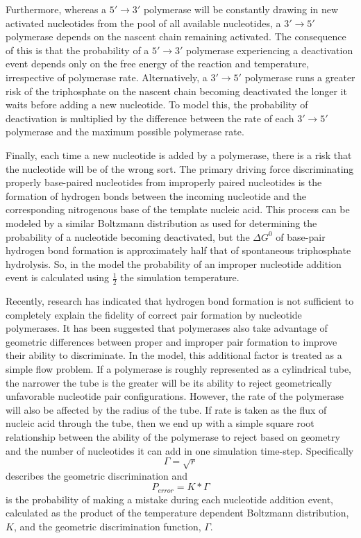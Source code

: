 Furthermore, whereas a $5'\to3'$ polymerase will be constantly drawing in new activated nucleotides from the pool of all available nucleotides, a $3'\to5'$ polymerase depends on the nascent chain remaining activated. The consequence of this is that the probability of a $5'\to3'$ polymerase experiencing a deactivation event depends only on the free energy of the reaction and temperature, irrespective of polymerase rate. Alternatively, a $3'\to5'$ polymerase runs a greater risk of the triphosphate on the nascent chain becoming deactivated the longer it waits before adding a new nucleotide. To model this, the probability of deactivation is multiplied by the difference between the rate of each $3'\to5'$ polymerase and the maximum possible polymerase rate.

Finally, each time a new nucleotide is added by a polymerase, there is a risk that the nucleotide will be of the wrong sort. The primary driving force discriminating properly base-paired nucleotides from improperly paired nucleotides is the formation of hydrogen bonds between the incoming nucleotide and the corresponding nitrogenous base of the template nucleic acid. This process can be modeled by a similar Boltzmann distribution as used for determining the probability of a nucleotide becoming deactivated, but the $\Delta G^0$ of base-pair hydrogen bond formation is approximately half that of spontaneous triphosphate hydrolysis. So, in the model the probability of an improper nucleotide addition event is calculated using $\frac{1}{2}$ the simulation temperature.

Recently, research has indicated that hydrogen bond formation is not sufficient to completely explain the fidelity of correct pair formation by nucleotide polymerases. It has been suggested that polymerases also take advantage of geometric differences between proper and improper pair formation to improve their ability to discriminate. In the model, this additional factor is treated as a simple flow problem. If a polymerase is roughly represented as a cylindrical tube, the narrower the tube is the greater will be its ability to reject geometrically unfavorable nucleotide pair configurations. However, the rate of the polymerase will also be affected by the radius of the tube. If rate is taken as the flux of nucleic acid through the tube, then we end up with a simple square root relationship between the ability of the polymerase to reject based on geometry and the number of nucleotides it can add in one simulation time-step. Specifically\[
	\Gamma = \sqrt{r}
\]
describes the geometric discrimination and\[
	P_{error} = K * \Gamma
\]
is the probability of making a mistake during each nucleotide addition event, calculated as the product of the temperature dependent Boltzmann distribution, $K$, and the geometric discrimination function, $\Gamma$.
